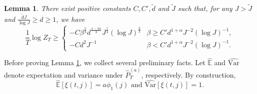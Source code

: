 \documentclass[12pt]{amsart}
\newtheorem{lemma}{Lemma}[section]
\numberwithin{equation}{section}
\newcommand{\E}{\mathbb{E}}
\newcommand{\1}{\mathbf{1}}
\begin{document}
\begin{lemma}\label{ZT} There exist positive constants $C,C',\tilde{d}$ and $\tilde{J}$ such that, for any $J>\tilde{J}$ and $\frac{\tilde{d}J}{\log J}\geq d\geq 1$, we have 
    \[\frac{1}{T}\log Z_T\geq \begin{cases}
            -C\beta^{\frac{2}{3}}d^{\frac{4-2\alpha}{3}}J^{\frac{1}{3}}(\log J)^{\frac{2}{3}} & \beta\geq C'd^{1+\alpha}J^{-2}(\log J)^{-1},\\
            -Cd^2J^{-1}&\beta<C'd^{1+\alpha}J^{-2}(\log J)^{-1}.\end{cases}\]
\end{lemma}
Before proving Lemma \ref{ZT}, we collect several preliminary facts. Let $\widehat{\E}$ and $\widehat{\text{Var}}$ denote expectation and variance under $\widehat{P}_T^{(a)}$, respectively. By construction,
\begin{equation*}
    \widehat{\E}[\xi(t,j)] = a\phi_1(j)\text{ and }\widehat{\text{Var}}[\xi(t,j)] = 1.
\end{equation*}
\end{document}
